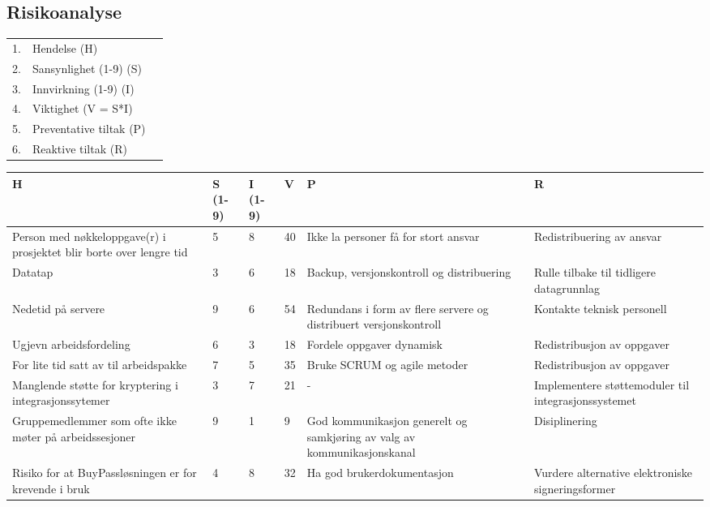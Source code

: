 \newpage
\subsection{Risikoanalyse}

\begin{tabular}{c l l}
    1. & Hendelse (H)\\
    2. & Sansynlighet (1-9) (S) \\
    3. & Innvirkning (1-9) (I) \\
    4. & Viktighet (V = S*I) \\
    5. & Preventative tiltak (P) \\
    6. & Reaktive tiltak (R) \\
\end{tabular}

\begin{tabular}{|p{}|p{}|p{}|p{}|p{}|p{}|} \hline
    H & S (1-9) & I (1-9) & V & P & R \\ \hline
    Person med nøkkeloppgave(r) i prosjektet blir borte over lengre tid & 5 & 8 & 40 & Ikke la personer få for stort ansvar & Redistribuering av ansvar \\ \hline
    Datatap & 3 & 6 & 18 & Backup, versjonskontroll og distribuering & Rulle tilbake til tidligere datagrunnlag \\ \hline
    Nedetid på servere & 9 & 6 & 54 & Redundans i form av flere servere og distribuert versjonskontroll & Kontakte teknisk personell \\ \hline
    Ugjevn arbeidsfordeling & 6 & 3 & 18 & Fordele oppgaver dynamisk & Redistribusjon av oppgaver \\ \hline
    For lite tid satt av til arbeidspakke & 7 & 5 & 35 & Bruke SCRUM og agile metoder & Redistribusjon av oppgaver \\ \hline
    Manglende støtte for kryptering i integrasjonssytemer & 3 & 7 & 21 & - & Implementere støttemoduler til integrasjonssystemet \\ \hline
    Gruppemedlemmer som ofte ikke møter på arbeidssesjoner & 9 & 1 & 9 & God kommunikasjon generelt og samkjøring av valg av kommunikasjonskanal & Disiplinering \\ \hline
    Risiko for at BuyPassløsningen er for krevende i bruk & 4 & 8 & 32 & Ha god
    brukerdokumentasjon & Vurdere alternative elektroniske signeringsformer \\ \hline
\end{tabular} 



